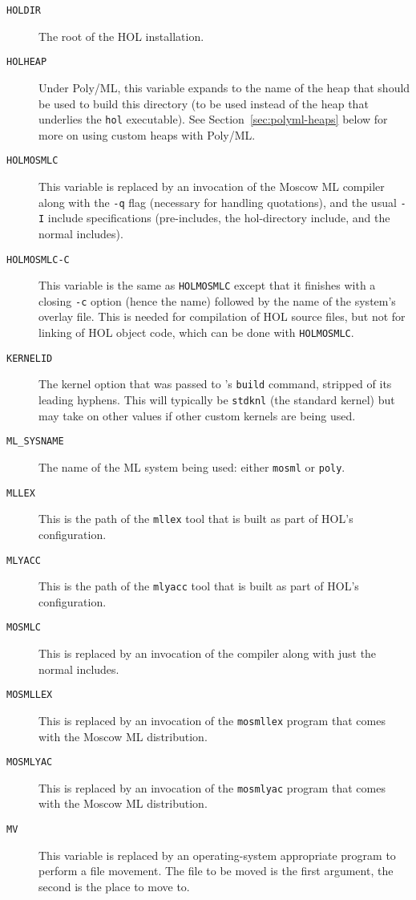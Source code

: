 \begin{description}
\item[\texttt{HOLDIR}] The root of the HOL installation.
\item[\texttt{HOLHEAP}]
Under Poly/ML, this variable expands to the name of the heap that should be used to build this directory (to be used instead of the heap that underlies the \texttt{hol} executable).
See Section~\ref{sec:polyml-heaps} below for more on using custom heaps with Poly/ML.
\item[\texttt{HOLMOSMLC}] This variable is replaced by an invocation
  of the Moscow ML compiler along with the \texttt{-q} flag (necessary
  for handling quotations), and the usual \texttt{-I} include
  specifications (pre-includes, the hol-directory include, and the
  normal includes).
\item[\texttt{HOLMOSMLC-C}] This variable is the same as
  \texttt{HOLMOSMLC} except that it finishes with a closing
  \texttt{-c} option (hence the name) followed by the name of the
  system's overlay file.  This is needed for compilation of HOL source
  files, but not for linking of HOL object code, which can be done
  with \texttt{HOLMOSMLC}.
\item[\texttt{KERNELID}]
  The kernel option that was passed to \HOL's \texttt{build} command, stripped of its leading hyphens.
  This will typically be \texttt{stdknl} (the standard kernel) but may take on other values if other custom kernels are being used.
\item[\texttt{ML\_SYSNAME}] The name of the ML system being used:
  either \texttt{mosml} or \texttt{poly}.
\item[\texttt{MLLEX}] This is the path of the \texttt{mllex} tool that
  is built as part of HOL's configuration.
\item[\texttt{MLYACC}] This is the path of the \texttt{mlyacc} tool that
  is built as part of HOL's configuration.
\item[\texttt{MOSMLC}] This is replaced by an invocation of the
  compiler along with just the normal includes.
\item[\texttt{MOSMLLEX}] This is replaced by an invocation of the
  \texttt{mosmllex} program that comes with the Moscow ML
  distribution.
\item[\texttt{MOSMLYAC}] This is replaced by an invocation of the
  \texttt{mosmlyac} program that comes with the Moscow ML
  distribution.
\item[\texttt{MV}] This variable is replaced by an operating-system
  appropriate program to perform a file movement.  The file to be
  moved is the first argument, the second is the place to move to.

\end{description}
